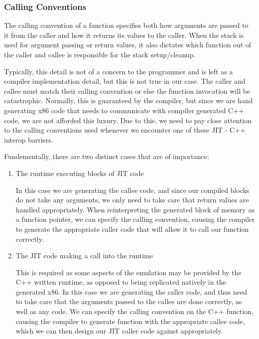 \subsubsection{Calling Conventions}
\label{section:calling-convs}

The calling convention of a function specifies both how arguments are passed to it from the caller and how it returns its values to the caller. When the stack is used for argument passing or return values, it also dictates which function out of the caller and callee is responsible for the stack setup/cleanup.

Typically, this detail is not of a concern to the programmer and is left as a compiler implementation detail, but this is not true in our case. The caller and callee must match their calling convention or else the function invocation will be catastrophic. Normally, this is guaranteed by the compiler, but since we are hand generating x86 code that needs to communicate with compiler generated C++ code, we are not afforded this luxury. Due to this, we need to pay close attention to the calling conventions used whenever we encounter one of these JIT - C++ interop barriers.

Fundementally, there are two distinct cases that are of importance:
\begin{enumerate}
    \item The runtime executing blocks of JIT code
    
    In this case we are generating the callee code, and since our compiled blocks do not take any arguments, we only need to take care that return values are handled appropriately. When reinterpreting the generated block of memory as a function pointer, we can specify the calling convention, causing the compiler to generate the appropriate caller code that will allow it to call our function correctly.
    
    \item The JIT code making a call into the runtime
    
    This is required as some aspects of the emulation may be provided by the C++ written runtime, as opposed to being replicated natively in the generated x86. In this case we are generating the caller code, and thus need to take care that the arguments passed to the callee are done correctly, as well as any  code. We can specify the calling convention on the C++ function, causing the compiler to generate function with the appropriate callee code, which we can then design our JIT caller code against appropriately.
\end{enumerate}

